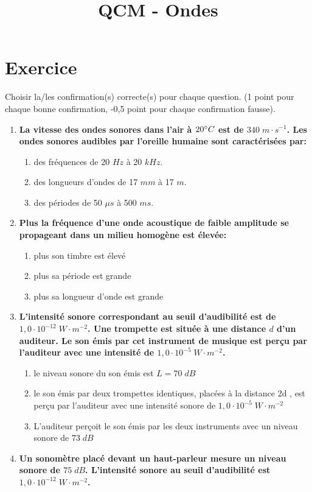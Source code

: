 \documentclass[11pt,a4paper]{article}
\title{QCM - Ondes}
\date{}
\author{}
\newcommand{\mps}{\; m\cdot s^{-1}}
\newcommand{\es}[1]{\cdot10^{#1}}
\begin{document}
\section*{Exercice}
Choisir la/les confirmation(s) correcte(s) pour chaque question. (1 point pour chaque bonne confirmation, -0,5 point pour chaque confirmation fausse). 

\begin{enumerate}
    \item 	\textbf{La vitesse des ondes sonores dans l’air à $20 \degree C$ est de $340 \mps$. Les ondes sonores audibles par l’oreille humaine sont caractérisées par: }
    \begin{enumerate}
        \item 	des fréquences de 20 $Hz$ à 20 $kHz$. 
	    \item des longueurs d’ondes de 17 $mm$ à 17 $m$. 
        \item des périodes de 50 $\mu s$ à 500 $ms$. 
    \end{enumerate}
    \item \textbf{Plus la fréquence d’une onde acoustique de faible amplitude se propageant dans un milieu homogène est élevée: }
    \begin{enumerate}
        \item plus son timbre est élevé
        \item plus sa période est grande
        \item plus sa longueur d’onde est grande
    \end{enumerate}
    \item 	\textbf{L’intensité sonore correspondant au seuil d’audibilité est de $1,0\es{-12}\; W\cdot m^{-2}$. Une trompette est située à une distance $d$ d’un auditeur. Le son émis par cet instrument de musique est perçu par l’auditeur avec une intensité de $1,0\es{-5}\; W\cdot m^{-2}$. }
    \begin{enumerate}
        \item le niveau sonore du son émis est $L=70\; dB$
        \item le son émis par deux trompettes identiques, placées à la distance 2d , est perçu par l’auditeur avec une intensité sonore de $1,0\es{-5}\; W\cdot m^{-2}$
        \item L’auditeur perçoit le son émis par les deux instruments avec un niveau sonore de $73\; dB$
    \end{enumerate}
    \item 	\textbf{Un sonomètre placé devant un haut-parleur mesure un niveau sonore de $75\; dB$. L’intensité sonore au seuil d’audibilité est $1,0\es{-12}\; W\cdot m^{-2}$. }

\end{enumerate}
\end{document}
